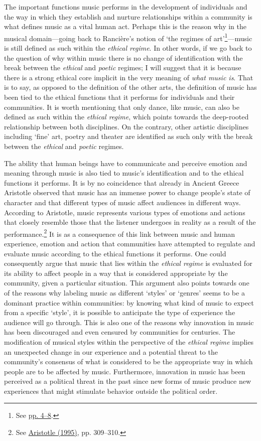 The important functions music performs in the development of individuals and the way in which they establish and nurture relationships within a community is what defines music as a vital human act. Perhaps this is the reason why in the musical domain---going back to Ranci\`{e}re's notion of `the regimes of art'\footnote{See \hyperlink{artregimes}{pp. 4--8}.}---music is still defined as such within the \emph{ethical regime}. In other words, if we go back to the question of why within music there is no change of identification with the break between the \emph{ethical} and \emph{poetic} regimes; I will suggest that it is because there is a strong ethical core implicit in the very meaning of \emph{what music is}. That is to say, as opposed to the definition of the other arts, the definition of music has been tied to the ethical functions that it performs for individuals and their communities. It is worth mentioning that only dance, like music, can also be defined as such within the \emph{ethical regime}, which points towards the deep-rooted relationship between both disciplines. On the contrary, other artistic disciplines including `fine' art, poetry and theater are identified as such only with the break between the \emph{ethical} and \emph{poetic} regimes.   

The ability that human beings have to communicate and perceive emotion and meaning through music is also tied to music's identification and to the ethical functions it performs. It is by no coincidence that already in Ancient Greece Aristotle observed that music has an immense power to change people's state of character and that different types of music affect audiences in different ways. According to Aristotle, music represents various types of emotions and actions that closely resemble those that the listener undergoes in reality as a result of the performance.\footnote{See \hyperlink{aristotle}{Aristotle (1995)}, pp. 309--310.} It is as a consequence of this link between music and human experience, emotion and action that communities have attempted to regulate and evaluate music according to the ethical functions it performs. One could consequently argue that music that lies within the \emph{ethical regime} is evaluated for its ability to affect people in a way that is considered appropriate by the community, given a particular situation. This argument also points towards one of the reasons why labeling music as different `styles' or `genres' seems to be a dominant practice within communities: by knowing what kind of music to expect from a specific `style', it is possible to anticipate the type of experience the audience will go through. This is also one of the reasons why innovation in music has been discouraged and even censured by communities for centuries. The modification of musical styles within the perspective of the \emph{ethical regime} implies an unexpected change in our experience and a potential threat to the community's consensus of what is considered to be the appropriate way in which people are to be affected by music. Furthermore, innovation in music has been perceived as a political threat in the past since new forms of music produce new experiences that might stimulate behavior outside the political order. 

